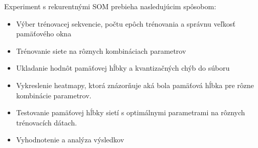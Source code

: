 Experiment s rekurentnými SOM prebieha nasledujúcim spôsobom:
\begin{itemize}
    \item Výber trénovacej sekvencie, počtu epôch trénovania a správnu veľkosť pamäťového okna
    \item Trénovanie siete na rôznych kombináciach parametrov
    \item Ukladanie hodnôt pamäťovej hĺbky a kvantizačných chýb do súboru
    \item Vykreslenie heatmapy, ktorá znázorňuje aká bola pamäťová hĺbka pre rôzne kombinácie parametrov.
    \item Testovanie pamäťovej hĺbky sietí s optimálnymi parametrami na rôznych trénovacích dátach.
    \item Vyhodnotenie a analýza výsledkov
\end{itemize}







